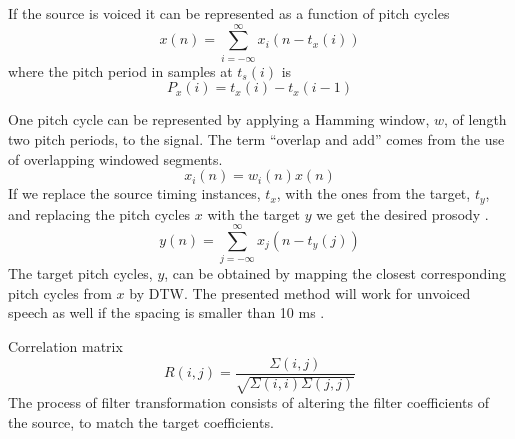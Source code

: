 If the source is voiced it can be represented as a function of pitch cycles
\begin{equation}
	x(n)=\sum_{i=-\infty}^{\infty}x_i(n-t_x(i))
\end{equation}
where the pitch period in samples at $t_s(i)$ is
\begin{equation}
	P_x(i)=t_x(i)-t_x(i-1)
\end{equation}

One pitch cycle can be represented by applying a Hamming window, $w$, of length two pitch periods, to the signal. The term ``overlap and add'' comes from the use of overlapping windowed segments.
\begin{equation}
	x_i(n)=w_i(n)x(n)
\end{equation}
If we replace the source timing instances, $t_x$, with the ones from the target, $t_y$, and replacing the pitch cycles $x$ with the target $y$ we get the desired prosody \cite{taletek}.
\begin{equation}
	y(n)=\sum_{j=-\infty}^{\infty}x_j(n-t_y(j)) %
\end{equation}
The target pitch cycles, $y$, can be obtained by mapping the closest corresponding pitch cycles from $x$ by \eg DTW. The presented method will work for unvoiced speech as well if the spacing is smaller than 10 ms \cite{taletek}. 
\cite{moulines95}


Correlation matrix
\begin{equation}
	R(i,j) = \frac{\Sigma(i,j)}{\sqrt{\Sigma(i,i)\Sigma(j,j)}}
\end{equation}
The process of filter transformation consists of altering the filter coefficients of the source, to match the target coefficients. 

